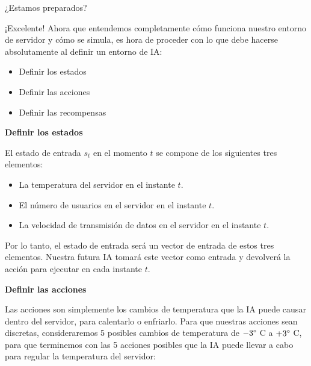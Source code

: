 \documentclass[]{book}
\providecommand{\tightlist}{%
  \setlength{\itemsep}{0pt}\setlength{\parskip}{0pt}}
\begin{document}
¿Estamos preparados?

¡Excelente! Ahora que entendemos completamente cómo funciona nuestro entorno de servidor y cómo se simula, es hora de proceder con lo que debe hacerse absolutamente al definir un entorno de IA:

\begin{itemize}
\tightlist
\item
  Definir los estados
\item
  Definir las acciones
\item
  Definir las recompensas
\end{itemize}

\textbf{Definir los estados}

El estado de entrada \(s_t\) en el momento \(t\) se compone de los siguientes tres elementos:

\begin{itemize}
\tightlist
\item
  La temperatura del servidor en el instante \(t\).
\item
  El número de usuarios en el servidor en el instante \(t\).
\item
  La velocidad de transmisión de datos en el servidor en el instante \(t\).
\end{itemize}

Por lo tanto, el estado de entrada será un vector de entrada de estos tres elementos. Nuestra futura IA tomará este vector como entrada y devolverá la acción para ejecutar en cada instante \(t\).

\textbf{Definir las acciones}

Las acciones son simplemente los cambios de temperatura que la IA puede causar dentro del servidor, para calentarlo o enfriarlo. Para que nuestras acciones sean discretas, consideraremos 5 posibles cambios de temperatura de \(-3 \degree\) C a \(+ 3 \degree\) C, para que terminemos con las 5 acciones posibles que la IA puede llevar a cabo para regular la temperatura del servidor:
\end{document}
